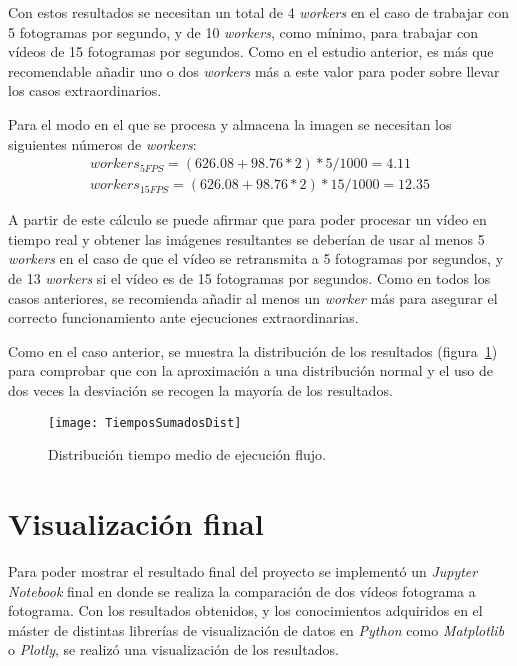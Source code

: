 {Con estos resultados se necesitan un total de 4 \textit{workers} en el caso de trabajar con 5 fotogramas por segundo, y de 10 \textit{workers}, como mínimo, para trabajar con vídeos de 15 fotogramas por segundos. Como en el estudio anterior, es más que recomendable añadir uno o dos \textit{workers} más a este valor para poder sobre llevar los casos extraordinarios.

Para el modo en el que se procesa y almacena la imagen se necesitan los siguientes números de \textit{workers}:
\begin{equation}
\begin{split}
workers_{5FPS} = (626.08 + 98.76*2)*5/1000 = 4.11\\
workers_{15FPS} = (626.08 + 98.76*2)*15/1000 = 12.35
\end{split}
\end{equation}

A partir de este cálculo se puede afirmar que para poder procesar un vídeo en tiempo real y obtener las imágenes resultantes se deberían de usar al menos 5 \textit{workers} en el caso de que el vídeo se retransmita a 5 fotogramas por segundos, y de 13 \textit{workers} si el vídeo es de 15 fotogramas por segundos. Como en todos los casos anteriores, se recomienda añadir al menos un \textit{worker} más para asegurar el correcto funcionamiento ante ejecuciones extraordinarias.

Como en el caso anterior, se muestra la distribución de los resultados (figura~\ref{fig:dist2}) para comprobar que con la aproximación a una distribución normal y el uso de dos veces la desviación se recogen la mayoría de los resultados.

\begin{figure}[h]
	\centering
	\texttt{[image: TiemposSumadosDist]}
	\caption{Distribución tiempo medio de ejecución flujo.}
	\label{fig:dist2}
\end{figure}

\section{Visualización final}
Para poder mostrar el resultado final del proyecto se implementó un \textit{Jupyter Notebook} final en donde se realiza la comparación de dos vídeos fotograma a fotograma. Con los resultados obtenidos, y los conocimientos adquiridos en el máster de distintas librerías de visualización de datos en \textit{Python} como \textit{Matplotlib} o \textit{Plotly}, se realizó una visualización de los resultados.

}
